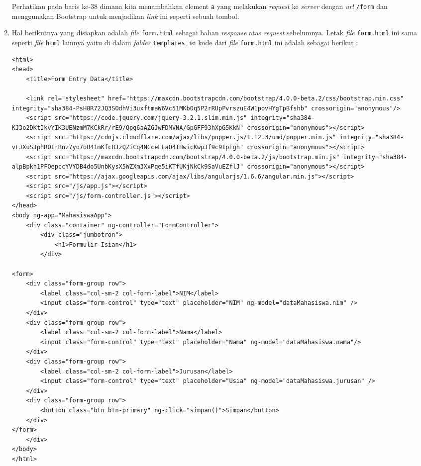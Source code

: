 \begin{enumerate}
	Perhatikan pada baris ke-38 dimana kita menambahkan element \texttt{a} yang melakukan \textit{request} ke \textit{server} dengan \textit{url} \texttt{/form} dan menggunakan Bootstrap untuk menjadikan \textit{link} ini seperti sebuah tombol.
	
	\item Hal berikutnya yang disiapkan adalah \textit{file} \texttt{form.html} sebagai bahan \textit{response} atas \textit{request} sebelumnya. Letak \textit{file} \texttt{form.html} ini sama seperti \textit{file} \texttt{html} lainnya yaitu di dalam \textit{folder} \texttt{templates}, isi kode dari \textit{file} \texttt{form.html} ini adalah sebagai berikut :
	
	\begin{lstlisting}
<html>
<head>
    <title>Form Entry Data</title>
    
    <link rel="stylesheet" href="https://maxcdn.bootstrapcdn.com/bootstrap/4.0.0-beta.2/css/bootstrap.min.css" integrity="sha384-PsH8R72JQ3SOdhVi3uxftmaW6Vc51MKb0q5P2rRUpPvrszuE4W1povHYgTpBfshb" crossorigin="anonymous"/>
    <script src="https://code.jquery.com/jquery-3.2.1.slim.min.js" integrity="sha384-KJ3o2DKtIkvYIK3UENzmM7KCkRr/rE9/Qpg6aAZGJwFDMVNA/GpGFF93hXpG5KkN" crossorigin="anonymous"></script>
    <script src="https://cdnjs.cloudflare.com/ajax/libs/popper.js/1.12.3/umd/popper.min.js" integrity="sha384-vFJXuSJphROIrBnz7yo7oB41mKfc8JzQZiCq4NCceLEaO4IHwicKwpJf9c9IpFgh" crossorigin="anonymous"></script>
    <script src="https://maxcdn.bootstrapcdn.com/bootstrap/4.0.0-beta.2/js/bootstrap.min.js" integrity="sha384-alpBpkh1PFOepccYVYDB4do5UnbKysX5WZXm3XxPqe5iKTfUKjNkCk9SaVuEZflJ" crossorigin="anonymous"></script>
    <script src="https://ajax.googleapis.com/ajax/libs/angularjs/1.6.6/angular.min.js"></script>
    <script src="/js/app.js"></script>
    <script src="/js/form-controller.js"></script>
</head>
<body ng-app="MahasiswaApp">
    <div class="container" ng-controller="FormController">
        <div class="jumbotron">
            <h1>Formulir Isian</h1>
        </div>
        
<form>
    <div class="form-group row">
        <label class="col-sm-2 col-form-label">NIM</label>
        <input class="form-control" type="text" placeholder="NIM" ng-model="dataMahasiswa.nim" />
    </div>
    <div class="form-group row">
        <label class="col-sm-2 col-form-label">Nama</label>
        <input class="form-control" type="text" placeholder="Nama" ng-model="dataMahasiswa.nama"/>
    </div>
    <div class="form-group row">
        <label class="col-sm-2 col-form-label">Jurusan</label>
        <input class="form-control" type="text" placeholder="Usia" ng-model="dataMahasiswa.jurusan" />
    </div>    
    <div class="form-group row">
        <button class="btn btn-primary" ng-click="simpan()">Simpan</button>
    </div>
</form>
    </div>
</body>
</html>
	\end{lstlisting}
	

\end{enumerate}
